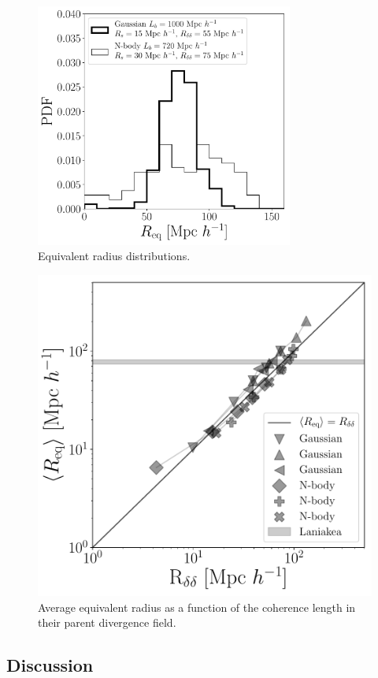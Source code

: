 \documentclass[usenatbib]{mnras}
\begin{document}
\begin{figure}
    \centering
    \includegraphics[width=240pt]{sizes_histogram.pdf}
    \caption{Equivalent radius distributions.}  
    \label{fig:Nclusters}
\end{figure}


\begin{figure}
    \centering
    \includegraphics[width=350pt]{summary_watershed.pdf}
    \caption{Average equivalent radius as a function of the coherence length in their parent divergence field.}  
    \label{fig:Nclusters}
\end{figure}



\subsection{Discussion}
\end{document}
